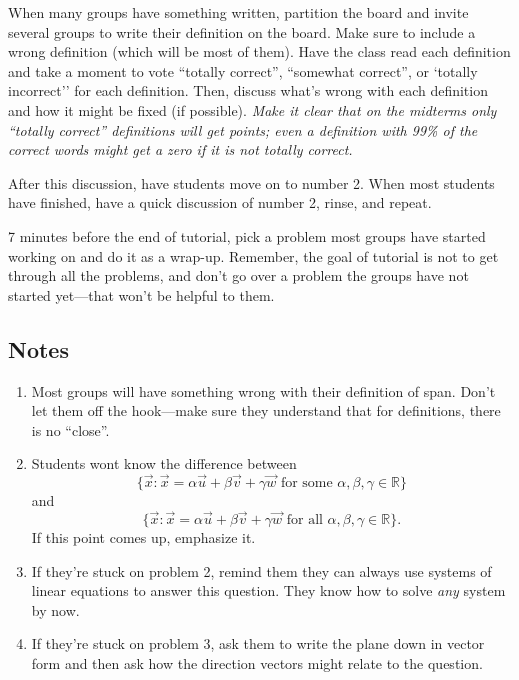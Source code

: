 \documentclass[red]{tutorial}
\newcommand{\R}{\mathbb{R}}
\theoremstyle{definition}
\theoremstyle{theorem}
\begin{document}
\begin{instructions}
	When many groups have something written, partition the board and invite several groups to
	write their definition on the board. Make sure to include a wrong definition (which will be
	most of them). Have the class read each definition and take a moment to vote
	``totally correct'', ``somewhat correct'', or `totally incorrect'' for each definition.
	Then, discuss what's wrong with each definition and how it might be fixed (if possible).
	\emph{Make it clear that on the midterms only ``totally correct'' definitions will get points;
	even a definition with 99\% of the correct words might get a zero if it is not totally correct.}

	After this discussion, have students move on to number 2. When most students have finished, 
		have a quick discussion of number 2, rinse, and repeat.
	
	7 minutes before the end of tutorial, pick a problem most groups have started working on
	and do it as a wrap-up. Remember, the goal of tutorial is not to get through all the problems, 
	and don't go over a problem the groups have not started yet---that won't be helpful to them.


\subsection*{Notes}
		\begin{enumerate}
			\item Most groups will have something wrong with their definition of span.
				Don't let them off the hook---make sure they understand that for
				definitions, there is no ``close''.
			\item Students wont know the difference between 
				\[
			\{\vec x:\vec x=\alpha\vec u+\beta\vec v+\gamma \vec w\text{ for some }\alpha,\beta,\gamma\in \R\}
				\]
				and
				\[
			\{\vec x:\vec x=\alpha\vec u+\beta\vec v+\gamma \vec w\text{ for all }\alpha,\beta,\gamma\in \R\}.
				\]
				If this point comes up, emphasize it.
			\item If they're stuck on problem 2, remind them they can always use systems of linear equations to answer
				this question. They know how to solve \emph{any} system by now.

			\item If they're stuck on problem 3, ask them to write the plane down in vector form and then
				ask how the direction vectors might relate to the question.
		\end{enumerate}

	\end{instructions}
\end{document}
